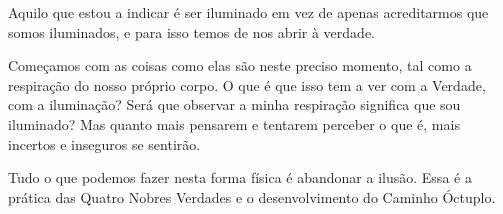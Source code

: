Aquilo que estou a indicar é ser iluminado em vez de apenas acreditarmos que
somos iluminados, e para isso temos de nos abrir à verdade.

Começamos com as coisas como elas são neste preciso momento, tal como a
respiração do nosso próprio corpo. O que é que isso tem a ver com a Verdade, com
a iluminação? Será que observar a minha respiração significa que sou iluminado?
Mas quanto mais pensarem e tentarem perceber o que é, mais
incertos e inseguros se sentirão.

Tudo o que podemos fazer nesta forma física é abandonar a ilusão. Essa é a
prática das Quatro Nobres Verdades e o desenvolvimento do Caminho Óctuplo.

